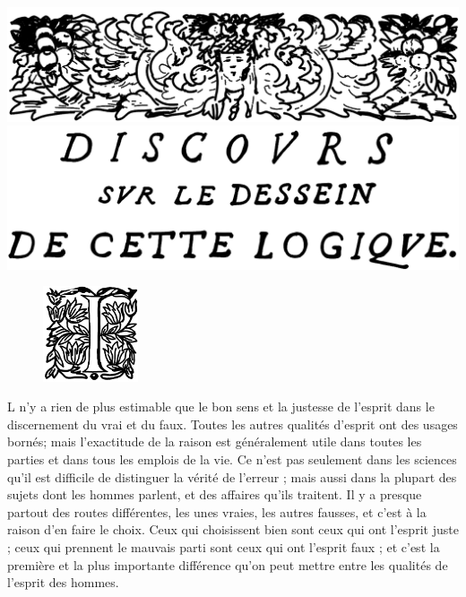 \section*{}

\begin{center}
	\includegraphics[scale=0.135]{images/en-tete-discours-sur-le-dessein.png}
	\bigbreak
	\includegraphics[scale=0.16]{images/titre-discours-sur-le-dessein.png}
\end{center}

\begin{figure}
    \includegraphics[width=0.25\textwidth]{images/enluminure-I.png}
\end{figure}
\noindent{} L n'y a rien de plus estimable que le bon sens et la justesse de l'esprit dans le discernement du vrai et du faux. Toutes les autres qualités d'esprit ont des usages bornés; mais l'exactitude de la raison est généralement utile dans toutes les parties et dans tous les emplois de la vie. Ce n'est pas seulement dans les sciences qu'il est difficile de distinguer la vérité de l'erreur ; mais aussi dans la plupart des sujets dont les hommes parlent, et des affaires qu'ils traitent. Il y a presque partout des routes différentes, les unes vraies, les autres fausses, et c'est à la raison d'en faire le choix. Ceux qui choisissent bien sont ceux qui ont l'esprit juste ; ceux qui prennent le mauvais parti sont ceux qui ont l'esprit faux ; et c'est la première et la plus importante différence qu'on peut mettre entre les qualités de l'esprit des hommes.

